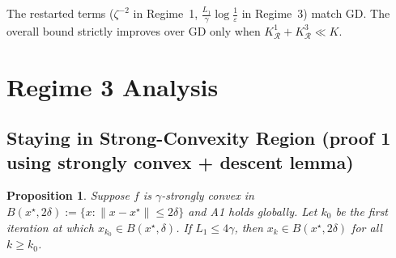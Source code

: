 \documentclass{article}
\newtheorem{proposition}{Proposition}
\begin{document}
The restarted terms ($\zeta^{-2}$ in Regime~1, $\frac{L_1}{\gamma}\log\frac{1}{\varepsilon}$ in Regime~3) match GD. 
The overall bound strictly improves over GD only when $K^1_{\mathcal{R}} + K^3_{\mathcal{R}} \ll K$. 


\section{Regime 3 Analysis}
\label{sec:regime3stay}

\subsection{Staying in Strong-Convexity Region (proof 1 using strongly convex + descent lemma)}
\label{subsubsec:staying}

\begin{proposition}
\label{prop:stay}
Suppose $f$ is $\gamma$-strongly convex in $B(x^\star, 2\delta) := \{x : \|x - x^\star\| \leq 2\delta\}$ and A1 holds globally. Let $k_0$ be the first iteration at which $x_{k_0} \in B(x^\star, \delta)$. If $L_1 \leq 4\gamma$, then $x_k \in B(x^\star, 2\delta)$ for all $k \geq k_0$.
\end{proposition}
\end{document}
